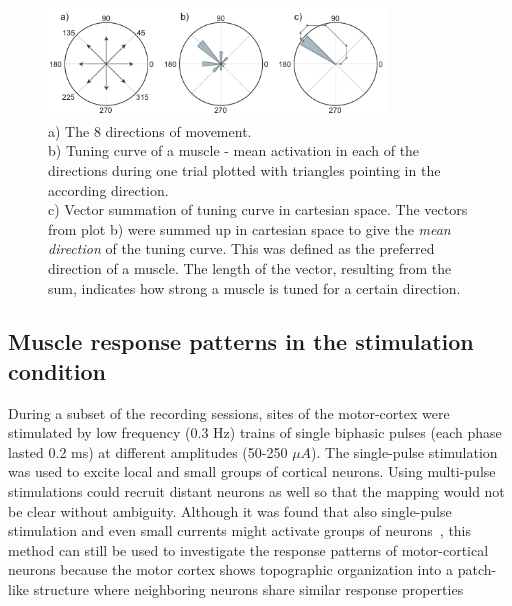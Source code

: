 \begin{figure}[ht]
	\centering
		\includegraphics[width=0.8\textwidth]{images/pd.jpg}
	\caption
	{
	a) The 8 directions of movement. \\
	b) Tuning curve of a muscle - mean activation in each of the directions during one trial plotted with triangles pointing in the according direction. \\
	c) Vector summation of tuning curve in cartesian space. The vectors from plot b) were summed up in cartesian space to give the \emph{mean direction} of the tuning curve. This was defined as the preferred direction of a muscle. The length of the vector, resulting from the sum, indicates how strong a muscle is tuned for a certain direction.\\
	}
	\label{sg:fig:images_pd}
\end{figure}



% 
\subsection{Muscle response patterns in the stimulation condition} %
\label{sg:sub:evoked_responses}

During a subset of the recording sessions, sites of the motor-cortex were stimulated by low frequency (0.3 Hz) trains of single biphasic pulses (each phase lasted 0.2 ms) at different amplitudes (50-250 $\mu A$). The single-pulse stimulation was used to excite local and small groups of cortical neurons. Using multi-pulse stimulations could recruit distant neurons as well so that the mapping would not be clear without ambiguity. Although it was found that also single-pulse stimulation and even small currents might activate groups of neurons~\citet{Tehovnik:1996p3982}, this method can still be used to investigate the response patterns of motor-cortical neurons because the motor cortex shows topographic organization into a patch-like structure where neighboring neurons share similar response properties~\citet{Lee:1998p4164}

